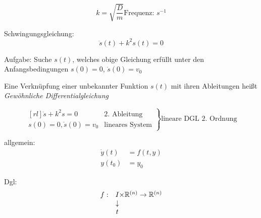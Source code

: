 \begin{itemize}
	\begin{equation*}
		k = \sqrt{\frac{D}{m}} \text{Frequenz: $s^{-1}$}
	\end{equation*}
	
	Schwingungsgleichung:
	\begin{equation*}
		\ddot s(t) + k^2 s(t) = 0
	\end{equation*}
	
	Aufgabe: Suche $s(t)$, welches obige Gleichung erfüllt unter den Anfangsbedingungen $s(0) = 0$, $ \dot s(0) = v_0$ \\
	\begin{definition}
	Eine Verknüpfung einer unbekannter Funktion $s(t)$ mit ihren Ableitungen heißt \emph{Gewöhnliche Differentialgleichung}
	\end{definition}
	
	\begin{equation*}
		\left.
		\begin{matrix}[rl]
			\ddot s + k^2 s = 0 & \text{2. Ableitung} \\
			s(0) = 0, \dot s(0) = v_0 & \text{lineares System}
		\end{matrix}
		\right\}
		\text{lineare DGL 2. Ordnung}
	\end{equation*}
	
	allgemein:
	\begin{align*}
		\dot y(t) &= f(t, y) \\
		y(t_0) &= y_0
	\end{align*}
	
	Dgl: 
	\begin{equation*}
		\begin{matrix}
			f: &I& \hspace{-10px}\times \mathbb{R}^{(n)} \rightarrow \mathbb{R}^{(n)} \\
			& \downarrow & \\
			& t &
		\end{matrix}
	\end{equation*}
\end{itemize}